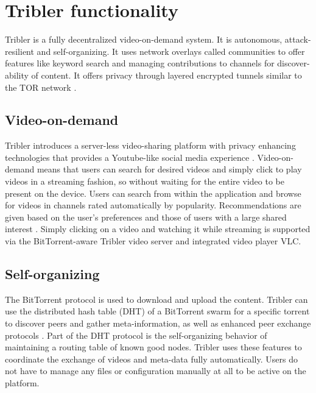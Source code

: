 \chapter{Tribler functionality}\label{ch:tribler}

Tribler is a fully decentralized video-on-demand system. \cite{TriblerOverviewJournal, tribler2014play, tribler-anon-hd}
It is autonomous, attack-resilient and self-organizing. \cite{votecast, tribler-gossip}
It uses network overlays called communities to offer features like keyword search and managing contributions to channels for discover-ability of content.
It offers privacy through layered encrypted tunnels similar to the TOR network \cite{tor_bittorrent, tribler2014at3, dingledine2004tor, dingledine2006design}.


\section{Video-on-demand}
Tribler introduces a server-less video-sharing platform with privacy enhancing technologies that provides a Youtube-like social media experience \cite{PawelOffloading}.
Video-on-demand means that users can search for desired videos and simply click to play videos in a streaming fashion, so without waiting for the entire video to be present on the device.
Users can search from within the application \cite{p2p_search} and browse for videos in channels rated automatically by popularity.
Recommendations are given based on the user's preferences and those of users with a large shared interest  \cite{Wang:SIGIR2007,ClementsIR2007}.
Simply clicking on a video and watching it while streaming is supported via the BitTorrent-aware Tribler video server and integrated video player VLC.


\section{Self-organizing}
The BitTorrent protocol is used to download and upload the content.
Tribler can use the distributed hash table (DHT) of a BitTorrent swarm for a specific torrent to discover peers and gather meta-information, as well as enhanced peer exchange protocols \cite{secure_swarm_discovery, swarm_discovery}.
Part of the DHT protocol is the self-organizing behavior of maintaining a routing table of known good nodes.
Tribler uses these features to coordinate the exchange of videos and meta-data fully automatically.
Users do not have to manage any files or configuration manually at all to be active on the platform.


